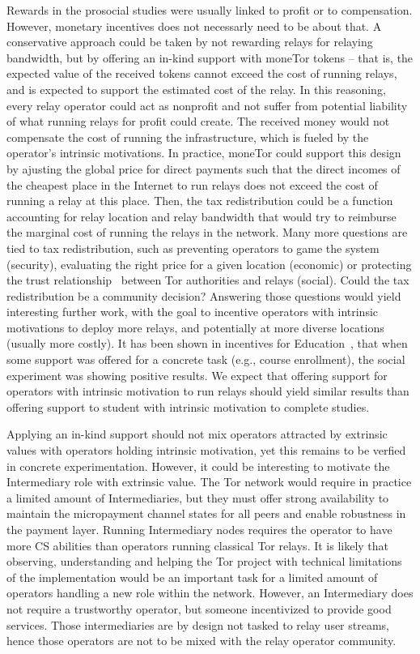 Rewards in the prosocial studies were usually linked to profit or to compensation. However, monetary 
incentives does not necessarly need to be about that. A 
conservative approach could be taken by not rewarding relays for relaying 
bandwidth, but by offering an
in-kind support with moneTor tokens -- that is, the expected value of the received tokens cannot exceed the cost of 
running relays, and is expected to support the estimated 
cost of the relay. In this reasoning, every relay operator could act as nonprofit and not 
suffer from potential liability of what running relays for profit could create. The received 
money would not compensate the 
cost of running the infrastructure, which is fueled by the operator's intrinsic 
motivations.  In practice, moneTor could support this design by ajusting the 
global price for direct payments such that the direct incomes of the 
cheapest place in the Internet to run relays does not exceed the cost of running 
a relay at this place. Then, the tax redistribution could be a function 
accounting for relay location and relay bandwidth that would try to reimburse 
the marginal cost of running the relays in the network. Many more questions are 
tied to tax redistribution, such as preventing operators to game the system 
(security), evaluating the right price for a given location (economic) or 
protecting the trust relationship~\cite{10.1257/aer.96.5.1611} between Tor authorities and 
relays (social). Could the tax redistribution be a community decision? 
Answering those questions would yield interesting further work, with the goal to incentive 
operators with intrinsic motivations to deploy 
more relays, and potentially at more diverse locations (usually more costly). It has been 
shown in incentives for Education~\cite{10.1257/jep.25.4.191, 10.1086/431263}, that when 
some support was offered for a concrete task (e.g., course enrollment), the social 
experiment was showing positive results. We expect that offering support for operators with 
intrinsic motivation to run relays should yield similar results than offering support to 
student with intrinsic motivation to complete studies.

Applying an in-kind support should not mix operators attracted by extrinsic 
values with operators holding intrinsic motivation, yet this remains to be 
verfied in concrete experimentation. However, it could be interesting to motivate the Intermediary 
role with extrinsic value. The Tor network would require in practice a 
limited amount of Intermediaries, but they must offer strong availability to 
maintain the micropayment channel states for all peers and enable 
robustness in the payment layer. Running Intermediary nodes requires the operator to have 
more CS abilities than operators running classical Tor relays. It is likely that observing, 
understanding and helping the Tor project with technical limitations of the implementation 
would be an important task for a limited amount of operators handling a new role within the 
network. However, an Intermediary does not require a trustworthy operator, but someone 
incentivized to provide good services.
Those intermediaries are by design not tasked 
to relay user streams, hence those operators are not to be mixed with the relay 
operator community.


